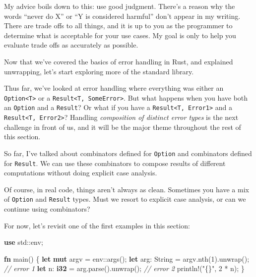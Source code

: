\documentclass[a4paper,]{book}
\newenvironment{Shaded}{\begin{snugshade}}{\end{snugshade}}
\newcommand{\KeywordTok}[1]{\textcolor[rgb]{0.13,0.29,0.53}{\textbf{{#1}}}}
\newcommand{\DecValTok}[1]{\textcolor[rgb]{0.00,0.00,0.81}{{#1}}}
\newcommand{\StringTok}[1]{\textcolor[rgb]{0.31,0.60,0.02}{{#1}}}
\newcommand{\CommentTok}[1]{\textcolor[rgb]{0.56,0.35,0.01}{\textit{{#1}}}}
\newcommand{\OtherTok}[1]{\textcolor[rgb]{0.56,0.35,0.01}{{#1}}}
\newcommand{\NormalTok}[1]{{#1}}
\begin{document}
My advice boils down to this: use good judgment. There's a reason why
the words ``never do X'' or ``Y is considered harmful'' don't appear in
my writing. There are trade offs to all things, and it is up to you as
the programmer to determine what is acceptable for your use cases. My
goal is only to help you evaluate trade offs as accurately as possible.

Now that we've covered the basics of error handling in Rust, and
explained unwrapping, let's start exploring more of the standard
library.


Thus far, we've looked at error handling where everything was either an
\texttt{Option\textless{}T\textgreater{}} or a
\texttt{Result\textless{}T,\ SomeError\textgreater{}}. But what happens
when you have both an \texttt{Option} and a \texttt{Result}? Or what if
you have a \texttt{Result\textless{}T,\ Error1\textgreater{}} and a
\texttt{Result\textless{}T,\ Error2\textgreater{}}? Handling
\emph{composition of distinct error types} is the next challenge in
front of us, and it will be the major theme throughout the rest of this
section.


So far, I've talked about combinators defined for \texttt{Option} and
combinators defined for \texttt{Result}. We can use these combinators to
compose results of different computations without doing explicit case
analysis.

Of course, in real code, things aren't always as clean. Sometimes you
have a mix of \texttt{Option} and \texttt{Result} types. Must we resort
to explicit case analysis, or can we continue using combinators?

For now, let's revisit one of the first examples in this section:

\begin{Shaded}
\begin{Highlighting}[]
\KeywordTok{use} \NormalTok{std::env;}

\KeywordTok{fn} \NormalTok{main() \{}
    \KeywordTok{let} \KeywordTok{mut} \NormalTok{argv = env::args();}
    \KeywordTok{let} \NormalTok{arg: String = argv.nth(}\DecValTok{1}\NormalTok{).unwrap(); }\CommentTok{// error 1}
    \KeywordTok{let} \NormalTok{n: }\KeywordTok{i32} \NormalTok{= arg.parse().unwrap(); }\CommentTok{// error 2}
    \OtherTok{println!}\NormalTok{(}\StringTok{"\{\}"}\NormalTok{, }\DecValTok{2} \NormalTok{* n);}
\NormalTok{\}}
\end{Highlighting}
\end{Shaded}
\end{document}
